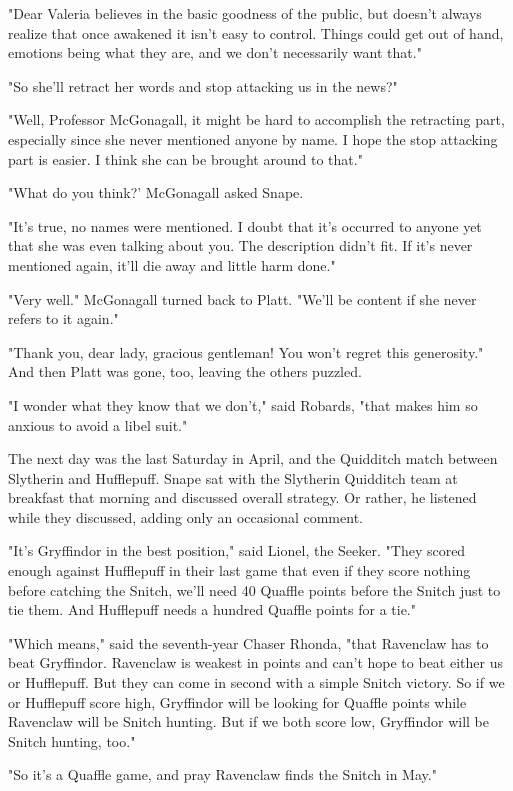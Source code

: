 \documentclass[a4paper,11pt]{article}
\begin{document}
"Dear Valeria believes in the basic goodness of the public, but doesn't always realize that once awakened it isn't easy to control. Things could get out of hand, emotions being what they are, and we don't necessarily want that."

"So she'll retract her words and stop attacking us in the news?"

"Well, Professor McGonagall, it might be hard to accomplish the retracting part, especially since she never mentioned anyone by name. I hope the stop attacking part is easier. I think she can be brought around to that."

"What do you think?' McGonagall asked Snape.

"It's true, no names were mentioned. I doubt that it's occurred to anyone yet that she was even talking about you. The description didn't fit. If it's never mentioned again, it'll die away and little harm done."

"Very well." McGonagall turned back to Platt. "We'll be content if she never refers to it again."

"Thank you, dear lady, gracious gentleman! You won't regret this generosity." And then Platt was gone, too, leaving the others puzzled.

"I wonder what they know that we don't," said Robards, "that makes him so anxious to avoid a libel suit."

The next day was the last Saturday in April, and the Quidditch match between Slytherin and Hufflepuff. Snape sat with the Slytherin Quidditch team at breakfast that morning and discussed overall strategy. Or rather, he listened while they discussed, adding only an occasional comment.

"It's Gryffindor in the best position," said Lionel, the Seeker. "They scored enough against Hufflepuff in their last game that even if they score nothing before catching the Snitch, we'll need 40 Quaffle points before the Snitch just to tie them. And Hufflepuff needs a hundred Quaffle points for a tie."

"Which means," said the seventh-year Chaser Rhonda, "that Ravenclaw has to beat Gryffindor. Ravenclaw is weakest in points and can't hope to beat either us or Hufflepuff. But they can come in second with a simple Snitch victory. So if we or Hufflepuff score high, Gryffindor will be looking for Quaffle points while Ravenclaw will be Snitch hunting. But if we both score low, Gryffindor will be Snitch hunting, too."

"So it's a Quaffle game, and pray Ravenclaw finds the Snitch in May."
\end{document}
